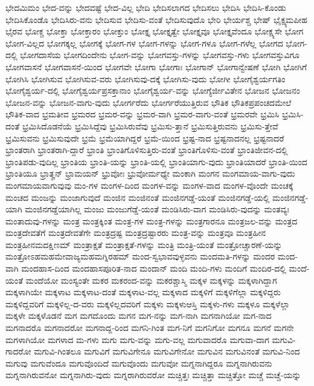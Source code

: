 {ಭೇದಮಿಮಂ
ಭೇದ-ವನ್ನು
ಭೇದವಷ್ಟೆ
ಭೇದ-ವಿಲ್ಲ
ಭೇದಿ
ಭೇದಿಸಲಾಗದ
ಭೇದಿಸಲು
ಭೇದಿಸಿ
ಭೇದಿಸಿ-ಕೊಂಡು
ಭೇದಿಸಿಕೊಂಡೊ
ಭೇದಿಸಿರು-ವನು
ಭೇದಿಸುವ
ಭೇದಿಸು-ವಂತೆ
ಭೇದಿಸುವುದೊ
ಭೇರಿ
ಭೇರ್ಯಶ್ಚ
ಭೇಷ್
ಭೈಕ್ಷ್ಯಮಪೀಹ
ಭೈರವ
ಭೋಕ್ಚ
ಭೋಕ್ತಾ
ಭೋಕ್ತಾರಂ
ಭೋಕ್ತುಂ
ಭೋಕ್ತೃ
ಭೋಕ್ತೃತ್ವೇ
ಭೋಕ್ತೃವೂ
ಭೋಕ್ತೃವೆಂದೂ
ಭೋಕ್ಷ್ಯಸೇ
ಭೋಗ
ಭೋಗ-ವಿಲ್ಲದ
ಭೋಗಕ್ಕಲ್ಲ
ಭೋಗಕ್ಕೆ
ಭೋಗ-ಗಳ
ಭೋಗ-ಗಳನ್ನು
ಭೋಗ-ಗಳೂ
ಭೋಗ-ಗಳೆಲ್ಲ
ಭೋಗದ
ಭೋಗ-ದಲ್ಲಿ
ಭೋಗದಾಸೆಯ
ಭೋಗದಿಂದೇನು
ಭೋಗ-ವನ್ನು
ಭೋಗವಸ್ತು-ಗಳನ್ನು
ಭೋಗವಸ್ತು-ಗಳು
ಭೋಗವಸ್ತುವಿಗೂ
ಭೋಗವಾಸನೆ
ಭೋಗವಾಸನೆ-ಯಿಂದ
ಭೋಗವೇ
ಭೋಗಾ
ಭೋಗಾಃ
ಭೋಗಾನ್
ಭೋಗಾನ್ವೇಷಣೆ
ಭೋಗಿ
ಭೋಗಿಗೆ
ಭೋಗಿಸಿ
ಭೋಗಿಸುವ
ಭೋಗಿಸುವ-ವರು
ಭೋಗಿಸುವು-ದಕ್ಕೆ
ಭೋಗಿಸು-ವುದು
ಭೋಗೀ
ಭೋಗೈಶ್ವರ್ಯಗತಿಂ
ಭೋಗೈಶ್ವರ್ಯ-ದಲ್ಲಿ
ಭೋಗೈಶ್ವರ್ಯಪ್ರಸಕ್ತಾನಾಂ
ಭೋಗೈಶ್ವರ್ಯ-ವನ್ನು
ಭೋಗ್ಯೆರ್ಜೀವಿತೇನ
ಭೋಜನ
ಭೋಜನಂ
ಭೋಜನ-ವನ್ನು
ಭೋಜನ-ವಾಗು-ವುದು
ಭೋರ್ಗರೆದು
ಭೋರ್ಗರೆಯುತ್ತಿರುವ
ಭೌತಿಕ
ಭೌತಿಕಪ್ರಪಂಚದಮೇಲೆ
ಭೌತಿಕ-ವಾದ
ಭ್ರಮತೀವ
ಭ್ರಮರದ
ಭ್ರಮರ-ವನ್ನು
ಭ್ರಮರ-ವಾಗಿ
ಭ್ರಮರ-ವಾಗು-ವಂತೆ
ಭ್ರಮರವೇ
ಭ್ರಮಿಸಿ
ಭ್ರಮಿಸಿ-ದಂತೆ
ಭ್ರಮಿಸಿದೊಡನೆಯೆ
ಭ್ರಮಿಸಿದ್ದೆವು
ಭ್ರಮಿಸಿರುವೆವು
ಭ್ರಮಿಸು-ತ್ತಾನೆ
ಭ್ರಮಿಸುತ್ತಿರುವನು
ಭ್ರಮಿಸು-ತ್ತೇವೆ
ಭ್ರಮಿಸುವನು
ಭ್ರಮಿಸುವುದೇ
ಭ್ರಮೆ
ಭ್ರಮೆಯಾಗಿದ್ದರೆ
ಭ್ರಮೆ-ಯಿಂದ
ಭ್ರಷ್ಟ-ನಾದ
ಭ್ರಷ್ಟನಾದನಲ್ಲ
ಭ್ರಷ್ಟನಾದರೆ
ಭ್ರಾಂತರಾಗಿ
ಭ್ರಾಂತರಾಗಿ-ದ್ದಾರೆ
ಭ್ರಾಂತಿ
ಭ್ರಾಂತಿಗೊಳಿಸುತ್ತಿರು-ವಂತೆ
ಭ್ರಾಂತಿಗೊಳಿಸು-ವಂತೆ
ಭ್ರಾಂತಿಜೀವನ-ದಲ್ಲಿ
ಭ್ರಾಂತಿಪಡು-ವುದಿಲ್ಲ
ಭ್ರಾಂತಿಯ
ಭ್ರಾಂತಿ-ಯನ್ನು
ಭ್ರಾಂತಿ-ಯಲ್ಲಿ
ಭ್ರಾಂತಿಯಾಗು-ವುದು
ಭ್ರಾಂತಿಯಾದರೆ
ಭ್ರಾಂತಿ-ಯಿಂದ
ಭ್ರಾಂತಿಯೂ
ಭ್ರಾತೄನ್
ಭ್ರಾಮಯನ್
ಭ್ರುವೋಃ
ಭ್ರುವೋರ್ಮಧ್ಯೇ
ಮಂಕಾಗಿ
ಮಂಗನ
ಮಂಗಮಾಯ-ವಾಗು-ವುದು
ಮಂಗಮಾಯವಾಗುವುವು
ಮಂ-ಗಳ
ಮಂಗಳ-ದಿಂದ
ಮಂಗಳ-ವನ್ನು
ಮಂಗಳ-ವಾದ
ಮಂಗಳ-ವೊಂದೇ
ಮಂಚಕ್ಕೆ
ಮಂಚದ
ಮಂಜನ್ನು
ಮಂಜಾಗುವುದೆ
ಮಂಜಿನ
ಮಂಜಿನಂತೆ
ಮಂಜಿನಗಡ್ಡೆ-ಯಂತೆ
ಮಂಜಿನಗಡ್ಡೆ-ಯಲ್ಲಿ
ಮಂಜಿನಗಡ್ಡೆ-ಯಾಗಿ
ಮಂಜಿನಗಡ್ಡೆಯಾಗಿಲ್ಲ
ಮಂಜು
ಮಂಜುಗೆಡ್ಡೆ-ಯಂತೆ
ಮಂಡಿಸಿರು-ವಾಗ
ಮಂಡಿಸಿರು-ವುದನ್ನು
ಮಂತವ್ಯಃ
ಮಂತಾದುವು-ಗಳನ್ನು
ಮಂತ್ರ
ಮಂತ್ರಕ್ಕಿಂತ
ಮಂತ್ರ-ಗಳ
ಮಂತ್ರ-ಗಳನ್ನು
ಮಂತ್ರಗಾರನೂ
ಮಂತ್ರಜಲ-ವನ್ನು
ಮಂತ್ರದ
ಮಂತ್ರದೇವತೆಗೆ
ಮಂತ್ರದೇವತೆಗೇ
ಮಂತ್ರದ್ರಷ್ಟ
ಮಂತ್ರದ್ರಷ್ಟಾರರು
ಮಂತ್ರ-ವನ್ನು
ಮಂತ್ರವೂ
ಮಂತ್ರಹೀನ
ಮಂತ್ರಹೀನಮದಕ್ಷಿಣಮ್
ಮಂತ್ರಾಕ್ಷತೆ
ಮಂತ್ರಾಕ್ಷತೆ-ಗಳನ್ನು
ಮಂತ್ರಿ
ಮಂತ್ರಿ-ಯಂತೆ
ಮಂತ್ರೋಚ್ಚಾರಣೆ-ಯನ್ನು
ಮಂತ್ರೋಽಹಮಹಮೇವಾಜ್ಯಮಹಮಗ್ನಿರಹಮ್
ಮಂದ-ಸ್ವಭಾವವುಳ್ಳವನು
ಮಂದಮತಿ-ಗಳನ್ನು
ಮಂದರ
ಮಂದ-ವಾಗಿ
ಮಂದಹಾಸ-ದಿಂದ
ಮಂದಹಾಸಪೂರಿತ-ನಾದ
ಮಂದಾನ್
ಮಂದಿ
ಮಂದಿ-ಗಳು
ಮಂದಿಗೆ
ಮಂದಿರ-ದಲ್ಲಿ
ಮಂದೆ-ಯಂತೆ
ಮಂದೆಯೋ
ಮಂಸ್ಯಂತೇ
ಮಕರ
ಮಕರಂದ-ವನ್ನು
ಮಕರಶ್ಚಾಸ್ಮಿ
ಮಕ್ಕಳ
ಮಕ್ಕಳನ್ನು
ಮಕ್ಕಳಾಗಿದ್ದಾಗ
ಮಕ್ಕಳಾಗಿಯೇ
ಮಕ್ಕಳಾಟ
ಮಕ್ಕಳಾಟ-ದಂತೆ
ಮಕ್ಕಳಾಟ-ವಲ್ಲ
ಮಕ್ಕಳಾದ
ಮಕ್ಕಳಿಗೆ
ಮಕ್ಕಳಿಗೆಲ್ಲಾ
ಮಕ್ಕಳಿದ್ದರು
ಮಕ್ಕಳಿದ್ದವರಿಗೆ
ಮಕ್ಕಳಿಲ್ಲ-ದ-ವರು
ಮಕ್ಕಳಿಲ್ಲದವರಿಗೆ
ಮಕ್ಕಳು
ಮಕ್ಕಳುಆಸ್ತಿ
ಮಕ್ಕಳು-ಗಳು
ಮಕ್ಕಳೂ
ಮಕ್ಕಳೆಲ್ಲಾ
ಮಕ್ಕಳೇ
ಮಕ್ಕಳೊಡನೆ
ಮಗ
ಮಗದೊಂದು
ಮಗನ
ಮಗ-ನನ್ನು
ಮಗ-ನಾಗಿ
ಮಗನಾಗಿಯೋ
ಮಗ-ನಾದ
ಮಗನಾದರೊ
ಮಗನಾದರೋ
ಮಗನಾದ್ದ-ರಿಂದ
ಮಗನಿ-ಗಿಂತ
ಮಗ-ನಿಗೆ
ಮಗನಿಗೋ
ಮಗನೂ
ಮಗನೆ
ಮಗನೇ
ಮಗಳಾಗಿಯೋ
ಮಗಳಾದ
ಮ-ಗಳು
ಮಗು
ಮಗು-ವನ್ನು
ಮಗು-ವಲ್ಲ
ಮಗುವಾದರೊ
ಮಗುವಾ-ದಾಗ
ಮಗುವಿ-ಗಾದರೋ
ಮಗುವಿ-ಗಿಂತಲೂ
ಮಗುವಿಗೆ
ಮಗುವಿಗೇನೂ
ಮಗುವಿಗೇನೋ
ಮಗುವಿನ
ಮಗುವಿನಂತೆ
ಮಗುವಿ-ನಿಂದ
ಮಗುವು
ಮಗುವೆಂದೂ
ಮಗುವೊಂದಿದೆ
ಮಗುವೊಂದು
ಮಗುವೋ
ಮಗ್ನನಾಗಿದ್ದರೂ
ಮಗ್ನನಾಗಿರುವನು
ಮಗ್ನನಾಗಿರುವನೋ
ಮಗ್ನನಾಗಿರು-ವುದು
ಮಗ್ನರಾಗಿರುವರೋ
ಮಚ್ಚಿತ್ತಃ
ಮಚ್ಚಿತ್ತಾ
ಮಚ್ಚಿತ್ತೋ
ಮಚ್ಚೆ
ಮಚ್ಚೆ-ಯನ್ನು
}
